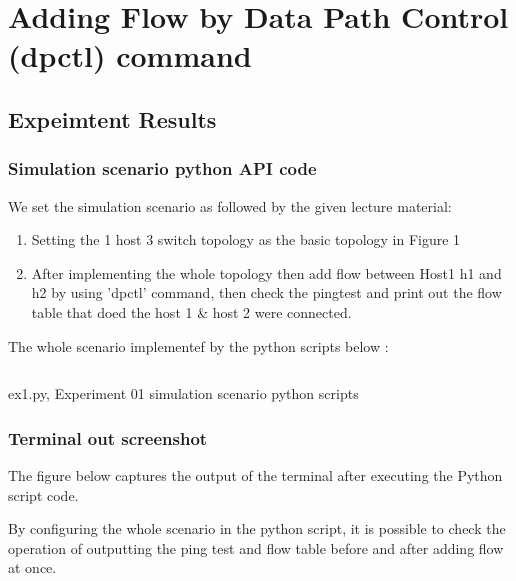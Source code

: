 \section{Adding Flow by Data Path Control (dpctl) command}
\subsection{Expeimtent Results}

\subsubsection{Simulation scenario python API code}
We set the simulation scenario as followed by the given lecture material:
\vspace{-2mm}
\begin{enumerate}
    \item Setting the 1 host 3 switch topology as the basic topology in Figure 1
    \vspace{-2mm}
    \item After implementing the whole topology then add flow between Host1 h1 and h2 by using 'dpctl' command, then check the pingtest and print out the flow table that doed the host 1 \& host 2 were connected.
\end{enumerate}
The whole scenario implementef by the python scripts below : 
\vspace{-2mm}
\begin{listing}[h!]
\inputminted[framerule = 1pt,framesep = 2mm , frame = lines, fontsize=\scriptsize]{python}{./code/week06/Experiment01.py}
\caption{\footnotesize ex1.py, Experiment 01 simulation scenario python scripts}
\end{listing}
\clearpage
\subsubsection{Terminal out screenshot}
The figure below captures the output of the terminal after executing the Python script code.

By configuring the whole scenario in the python script, it is possible to check the operation of outputting the ping test and flow table before and after adding flow at once.

